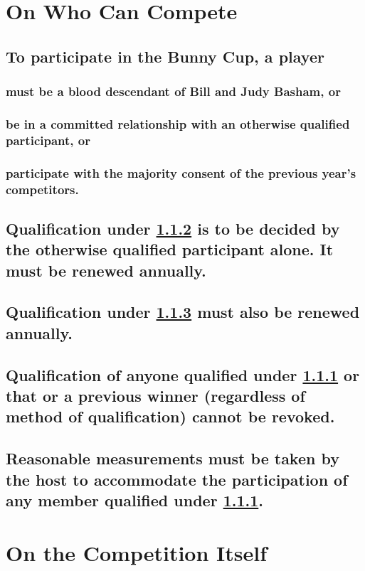 \documentclass[a4paper]{article}
\begin{document}

\section{On Who Can Compete}
\subsection{To participate in the Bunny Cup, a player}
\subsubsection{must be a blood descendant of Bill and Judy Basham, or}\label{blooddesc}
\subsubsection{be in a committed relationship with an otherwise qualified participant, or}\label{relationship}
\subsubsection{participate with the majority consent of the previous year's competitors.}\label{majorityconsentpart}
\subsection{Qualification under \ref{relationship} is to be decided by the otherwise qualified participant alone. It must be renewed annually.}
\subsection{Qualification under \ref{majorityconsentpart} must also be renewed annually.}
\subsection{Qualification of anyone qualified under \ref{blooddesc} or that or a previous winner (regardless of method of qualification) cannot be revoked.}
\subsection{Reasonable measurements must be taken by the host to accommodate the participation of any member qualified under \ref{blooddesc}.}


\newpage
\section{On the Competition Itself}
\end{document}
